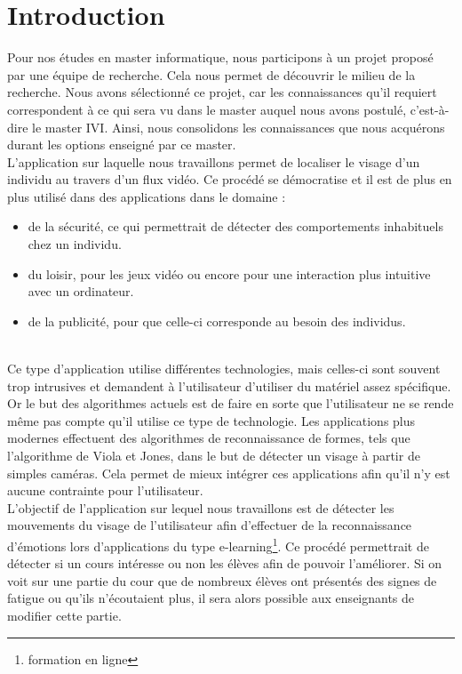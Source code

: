 \section{Introduction}

Pour nos études en master informatique, nous participons à un projet proposé par une 
équipe de recherche. Cela nous permet de découvrir le milieu de la recherche. Nous avons
sélectionné ce projet, car les connaissances qu'il requiert correspondent à ce qui sera
vu dans le master auquel nous avons postulé, c'est-à-dire le master IVI. Ainsi, nous 
consolidons les connaissances que nous acquérons durant les options enseigné par ce 
master.\\

L'application sur laquelle nous travaillons permet de localiser le visage
d'un individu au travers d'un flux vidéo.
Ce procédé se démocratise et il est de plus en plus utilisé dans des applications dans le domaine : 
\begin{itemize}
 \item de la sécurité, ce qui permettrait de détecter des comportements inhabituels chez un individu.
 \item du loisir, pour les jeux vidéo ou encore pour une interaction plus intuitive avec un ordinateur.
 \item de la publicité, pour que celle-ci corresponde au besoin des individus. 
\end{itemize}
\ \\
Ce type d'application utilise différentes technologies, mais celles-ci sont souvent trop intrusives 
et demandent à l'utilisateur d'utiliser du matériel assez spécifique. Or le but des algorithmes actuels
est de faire en sorte que l'utilisateur ne se rende même pas compte qu'il utilise ce type de technologie. Les applications plus 
modernes effectuent des algorithmes de reconnaissance de formes, tels que l'algorithme de Viola et Jones, dans 
le but de détecter un visage à partir de simples caméras. Cela permet de mieux intégrer ces applications 
afin qu'il n'y est aucune contrainte pour l'utilisateur.\\

L'objectif de l'application sur lequel nous travaillons est de détecter les mouvements
du visage de l'utilisateur afin d'effectuer de la reconnaissance d'émotions lors d'applications
du type e-learning\footnote{formation en ligne}. Ce procédé permettrait de détecter si un cours 
intéresse ou non les élèves afin de pouvoir l'améliorer. Si on voit sur une partie du cour
que de nombreux élèves ont présentés des signes de fatigue ou qu'ils n'écoutaient plus, il sera
alors possible aux enseignants de modifier cette partie.


